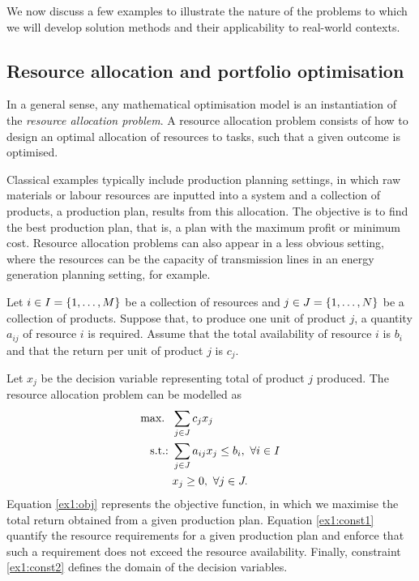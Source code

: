 We now discuss a few examples to illustrate the nature of the problems to which we will develop solution methods and their applicability to real-world contexts. 

\subsection{Resource allocation and portfolio optimisation} \label{sec:resource_allocation}

In a general sense, any mathematical optimisation model is an instantiation of the \emph{resource allocation problem}. A resource allocation problem consists of how to design an optimal allocation of resources to tasks, such that a given outcome is optimised. 

Classical examples typically include production planning settings, in which raw materials or labour resources are inputted into a system and a collection of products, a production plan, results from this allocation. The objective is to find the best production plan, that is, a plan with the maximum profit or minimum cost. Resource allocation problems can also appear in a less obvious setting, where the resources can be the capacity of transmission lines in an energy generation planning setting, for example.

Let $i \in I = \left\{ 1,\dots, M \right \}$ be a collection of resources and $j \in J = \left\{ 1,\dots,N \right \}$ be a collection of products. Suppose that, to produce one unit of product $j$, a quantity $a_{ij}$ of resource $i$ is required. Assume that the total availability of resource $i$ is $b_i$ and that the return per unit of product $j$ is $c_j$.

Let $x_j$ be the decision variable representing total of product $j$ produced. The resource allocation problem can be modelled as
%
\begin{align}
	\mathop{\text{max.~}} \ & \sum_{j \in J} c_j x_j \label{ex1:obj} \\
	\mathop{\text{s.t.:~}} & \sum_{j \in J}a_{ij} x_j \leq b_i, \ \forall i \in I \label{ex1:const1} \\
	& x_j \geq 0, \ \forall j \in J. \label{ex1:const2}
\end{align} 
%
Equation \eqref{ex1:obj} represents the objective function, in which we maximise the total return obtained from a given production plan. Equation \eqref{ex1:const1} quantify the resource requirements for a given production plan and enforce that such a requirement does not exceed the resource availability. Finally, constraint \eqref{ex1:const2} defines the domain of the decision variables.

